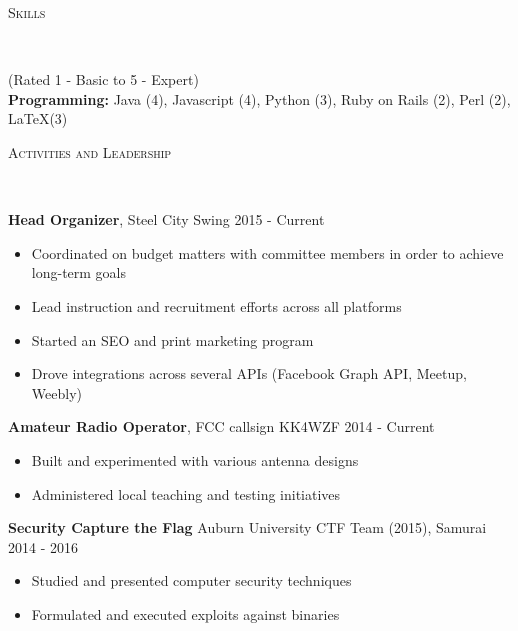 \documentclass[9pt]{article}
\newenvironment{changemargin}[2]{%
  \begin{list}{}{%
    \setlength{\topsep}{0pt}%
    \setlength{\leftmargin}{#1}%
    \setlength{\rightmargin}{#2}%
    \setlength{\listparindent}{\parindent}%
    \setlength{\itemindent}{\parindent}%
    \setlength{\parsep}{\parskip}%
  }%
  \item[]}{\end{list}
}
\newcommand{\lineover}{
	\begin{changemargin}{-0.05in}{-0.05in}
		\vspace*{-8pt}
		\hrulefill \\
		\vspace*{-2pt}
	\end{changemargin}
}
\newcommand{\header}[1]{
	\begin{changemargin}{-0.5in}{-0.5in}
		\scshape{#1}\\
  	\lineover
	\end{changemargin}
}
\newenvironment{body} {
	\vspace*{-16pt}
	\begin{changemargin}{-0.25in}{-0.5in}
  }	
	{\end{changemargin}
}
\begin{document}


\header{Skills}

\begin{body}
	\vspace{17pt}
	{(Rated 1 - Basic to 5 - Expert)} \\
	\textbf{Programming:} Java (4), Javascript (4), Python (3), Ruby on Rails (2), Perl (2), \LaTeX (3)\\
\end{body}

\smallskip


\header{Activities and Leadership}

\begin{body}
	\vspace{17pt}
	\textbf{Head Organizer}, Steel City Swing \hfill{} 2015 - Current\\
	\vspace{-4pt}
	\begin{itemize}
		\item{Coordinated on budget matters with committee members in order to achieve long-term goals}
		\item{Lead instruction and recruitment efforts across all platforms}
		\item{Started an SEO and print marketing program}
		\item{Drove integrations across several APIs (Facebook Graph API, Meetup, Weebly)}
	\end{itemize}
	\textbf{Amateur Radio Operator}, FCC callsign KK4WZF \hfill{} 2014 - Current\\
	\vspace{-4pt}
	\begin{itemize} \itemsep -0pt
		\item{Built and experimented with various antenna designs}
		\item{Administered local teaching and testing initiatives}
	\end{itemize}
\textbf{Security Capture the Flag} Auburn University CTF Team (2015), Samurai \hfill{} 2014 - 2016\\
	\vspace{-4pt}
	\begin{itemize} \itemsep -0pt
		\item{Studied and presented computer security techniques}
		\item{Formulated and executed exploits against binaries}

\end{itemize}
\end{body}
\end{document}
